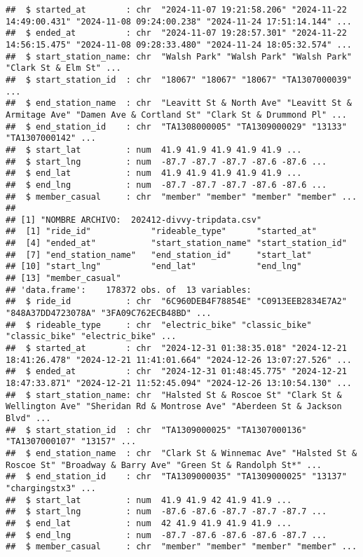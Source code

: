 \documentclass[
]{article}
\begin{document}
\begin{verbatim}
##  $ started_at        : chr  "2024-11-07 19:21:58.206" "2024-11-22 14:49:00.431" "2024-11-08 09:24:00.238" "2024-11-24 17:51:14.144" ...
##  $ ended_at          : chr  "2024-11-07 19:28:57.301" "2024-11-22 14:56:15.475" "2024-11-08 09:28:33.480" "2024-11-24 18:05:32.574" ...
##  $ start_station_name: chr  "Walsh Park" "Walsh Park" "Walsh Park" "Clark St & Elm St" ...
##  $ start_station_id  : chr  "18067" "18067" "18067" "TA1307000039" ...
##  $ end_station_name  : chr  "Leavitt St & North Ave" "Leavitt St & Armitage Ave" "Damen Ave & Cortland St" "Clark St & Drummond Pl" ...
##  $ end_station_id    : chr  "TA1308000005" "TA1309000029" "13133" "TA1307000142" ...
##  $ start_lat         : num  41.9 41.9 41.9 41.9 41.9 ...
##  $ start_lng         : num  -87.7 -87.7 -87.7 -87.6 -87.6 ...
##  $ end_lat           : num  41.9 41.9 41.9 41.9 41.9 ...
##  $ end_lng           : num  -87.7 -87.7 -87.7 -87.6 -87.6 ...
##  $ member_casual     : chr  "member" "member" "member" "member" ...
## 
## [1] "NOMBRE ARCHIVO:  202412-divvy-tripdata.csv"
##  [1] "ride_id"            "rideable_type"      "started_at"        
##  [4] "ended_at"           "start_station_name" "start_station_id"  
##  [7] "end_station_name"   "end_station_id"     "start_lat"         
## [10] "start_lng"          "end_lat"            "end_lng"           
## [13] "member_casual"     
## 'data.frame':    178372 obs. of  13 variables:
##  $ ride_id           : chr  "6C960DEB4F78854E" "C0913EEB2834E7A2" "848A37DD4723078A" "3FA09C762ECB48BD" ...
##  $ rideable_type     : chr  "electric_bike" "classic_bike" "classic_bike" "electric_bike" ...
##  $ started_at        : chr  "2024-12-31 01:38:35.018" "2024-12-21 18:41:26.478" "2024-12-21 11:41:01.664" "2024-12-26 13:07:27.526" ...
##  $ ended_at          : chr  "2024-12-31 01:48:45.775" "2024-12-21 18:47:33.871" "2024-12-21 11:52:45.094" "2024-12-26 13:10:54.130" ...
##  $ start_station_name: chr  "Halsted St & Roscoe St" "Clark St & Wellington Ave" "Sheridan Rd & Montrose Ave" "Aberdeen St & Jackson Blvd" ...
##  $ start_station_id  : chr  "TA1309000025" "TA1307000136" "TA1307000107" "13157" ...
##  $ end_station_name  : chr  "Clark St & Winnemac Ave" "Halsted St & Roscoe St" "Broadway & Barry Ave" "Green St & Randolph St*" ...
##  $ end_station_id    : chr  "TA1309000035" "TA1309000025" "13137" "chargingstx3" ...
##  $ start_lat         : num  41.9 41.9 42 41.9 41.9 ...
##  $ start_lng         : num  -87.6 -87.6 -87.7 -87.7 -87.7 ...
##  $ end_lat           : num  42 41.9 41.9 41.9 41.9 ...
##  $ end_lng           : num  -87.7 -87.6 -87.6 -87.6 -87.7 ...
##  $ member_casual     : chr  "member" "member" "member" "member" ...
\end{verbatim}
\end{document}

